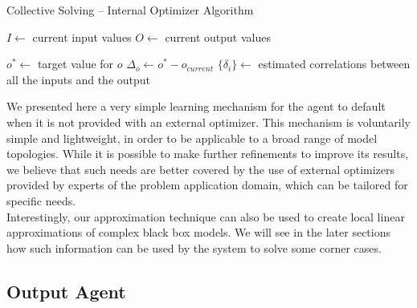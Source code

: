 \begin{algorithm}
\caption{Collective Solving -- Internal Optimizer Algorithm}
\label{algo_solving_internaloptim}

$I \leftarrow$ current input values\;
$O \leftarrow$ current output values\;

\BlankLine\BlankLine
{}
$o^* \leftarrow $ target value for $o$\;
$\Delta_o \leftarrow o^* - o_{current}$\;
$\{\delta_i\} \leftarrow $ estimated correlations between all the inputs and the output\;
\end{algorithm}

We presented here a very simple learning mechanism for the agent to default when it is not provided with an external optimizer. This mechanism is voluntarily simple and lightweight, in order to be applicable to a broad range of model topologies. While it is possible to make further refinements to improve its results, we believe that such needs are better covered by the use of external optimizers provided by experts of the problem application domain, which can be tailored for specific needs.\\
Interestingly, our approximation technique can also be used to create local linear approximations of complex black box models. We will see in the later sections how such information can be used by the system to solve some corner cases.

\subsection{Output Agent}

